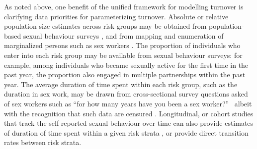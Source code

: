 \par
As noted above, one benefit of the unified framework for modelling turnover	
is clarifying data priorities for parameterizing turnover. 
Absolute or relative population size estimates across
risk groups may be obtained from
population-based sexual behaviour surveys \citep{DHS}, and from
mapping and enumeration of marginalized persons
such as sex workers \citep{Abdul-Quader2014}.
The proportion of individuals who enter into each risk group
may be available from sexual behaviour surveys:
for example, among individuals who became sexually active for the first time in the past year,
the proportion also engaged in multiple partnerships within the past year.
The average duration of time spent within each risk group, such as
the duration in sex work,
may be drawn from
cross-sectional survey questions asked of sex workers such as
``for how many years have you been a sex worker?''\ %
albeit with the recognition that such data are censured \citep{Watts2010}.
Longitudinal, or cohort studies
that track the self-reported sexual behaviour over time can also provide 
estimates of duration of time spent within a given risk strata \citep{Fergus2007}, 
or provide direct transition rates between risk strata.

